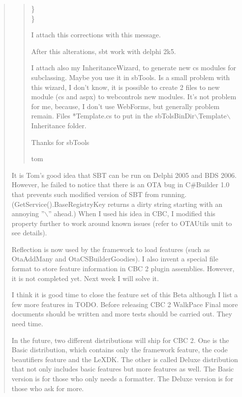 \begin{itemize}
\begin{quotation}
\begin{quote}
{      \tab       \}\\

      \}\\
      }


      I attach this corrections with this message.

      After this alterations, sbt work with delphi 2k5.



      I attach also my InheritanceWizard, to generate new cs modules for
      subclassing. Maybe you use it in sbTools. Is a small problem with
      this wizard, I don't know, it is possible to create 2 files to new
      module (cs and aspx) to webcontrols new modules. It's not problem
      for me, because, I don't use WebForms, but generally problem
      remain. Files *Template.cs to put in the
      sbTolsBinDir$\backslash$Template$\backslash$Inheritance folder.



      Thanks for sbTools



      tom
    \end{quote}

    It is Tom's good idea that SBT can be run on Delphi 2005 and BDS
    2006. However, he failed to notice that there is an OTA bug in
    C\#Bu\-ild\-er 1.0 that prevents such modified version of SBT from
    running. (GetService().Base\-Reg\-istry\-Key returns a dirty string
    starting with an annoying ''$\backslash$'' ahead.) When I used his
    idea in CBC, I modified this property further to work around known
    issues (refer to OTAUtils unit to see details).

    Reflection is now used by the framework to load features (such as
    OtaAddMany and OtaCSBuilderGoodies). I also invent a special file
    format to store feature information in CBC 2 plugin assemblies.
    However, it is not completed yet. Next week I will solve it.

    I think it is good time to close the feature set of this Beta
    although I list a few more features in TODO. Before releasing CBC 2
    WalkPace Final more documents should be written and more tests
    should be carried out. They need time.

    In the future, two different distributions will ship for CBC 2. One
    is the Basic distribution, which contains only the framework
    feature, the code beautifiers feature and the LeXDK. The other is
    called Deluxe distribution that not only includes basic features
    but more features as well. The Basic version is for those who only
    needs a formatter. The Deluxe version is for those who ask for more.


\end{quotation}
\end{itemize}
